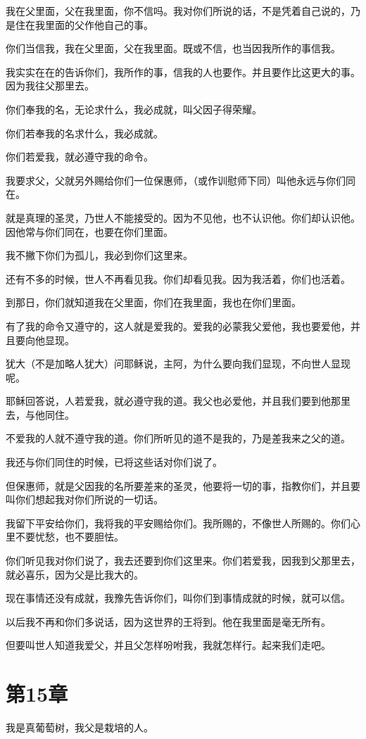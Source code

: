\documentclass[12pt,oneside]{book}
\begin{document}
我在父里面，父在我里面，你不信吗。我对你们所说的话，不是凭着自己说的，乃是住在我里面的父作他自己的事。

你们当信我，我在父里面，父在我里面。既或不信，也当因我所作的事信我。

我实实在在的告诉你们，我所作的事，信我的人也要作。并且要作比这更大的事。因为我往父那里去。

你们奉我的名，无论求什么，我必成就，叫父因子得荣耀。

你们若奉我的名求什么，我必成就。

你们若爱我，就必遵守我的命令。

我要求父，父就另外赐给你们一位保惠师，（或作训慰师下同）叫他永远与你们同在。

就是真理的圣灵，乃世人不能接受的。因为不见他，也不认识他。你们却认识他。因他常与你们同在，也要在你们里面。

我不撇下你们为孤儿，我必到你们这里来。

还有不多的时候，世人不再看见我。你们却看见我。因为我活着，你们也活着。

到那日，你们就知道我在父里面，你们在我里面，我也在你们里面。

有了我的命令又遵守的，这人就是爱我的。爱我的必蒙我父爱他，我也要爱他，并且要向他显现。

犹大（不是加略人犹大）问耶稣说，主阿，为什么要向我们显现，不向世人显现呢。

耶稣回答说，人若爱我，就必遵守我的道。我父也必爱他，并且我们要到他那里去，与他同住。

不爱我的人就不遵守我的道。你们所听见的道不是我的，乃是差我来之父的道。

我还与你们同住的时候，已将这些话对你们说了。

但保惠师，就是父因我的名所要差来的圣灵，他要将一切的事，指教你们，并且要叫你们想起我对你们所说的一切话。

我留下平安给你们，我将我的平安赐给你们。我所赐的，不像世人所赐的。你们心里不要忧愁，也不要胆怯。

你们听见我对你们说了，我去还要到你们这里来。你们若爱我，因我到父那里去，就必喜乐，因为父是比我大的。

现在事情还没有成就，我豫先告诉你们，叫你们到事情成就的时候，就可以信。

以后我不再和你们多说话，因为这世界的王将到。他在我里面是毫无所有。

但要叫世人知道我爱父，并且父怎样吩咐我，我就怎样行。起来我们走吧。

\chapter{第15章}
我是真葡萄树，我父是栽培的人。
\end{document}
